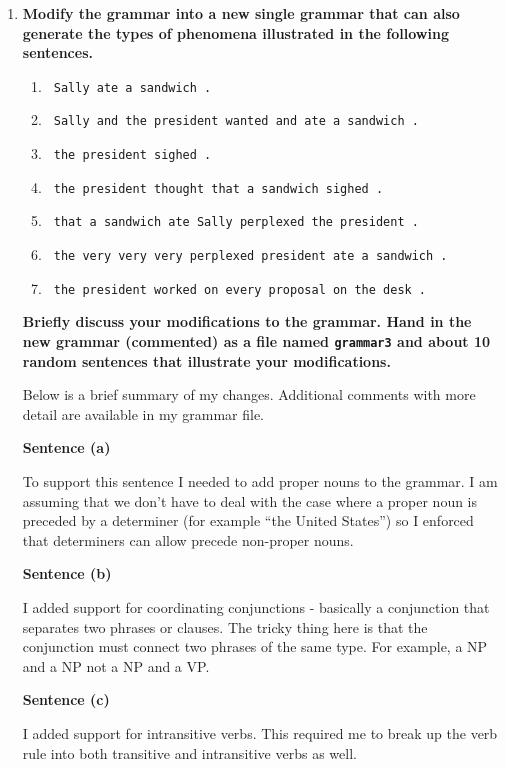 \documentclass[10pt]{article}
\begin{document}
\begin{enumerate}
\begin{enumerate}
{every perplexed sandwich kissed the president on a chief of staff with a president !

the fine chief of staff understood the president in the chief of staff .

}

\end{enumerate}
\item {\bf Modify the grammar into a new single grammar that can also generate the types of
  phenomena illustrated in the following sentences.}
\begin{enumerate}
\item \verb| Sally ate a sandwich .|
\item \verb| Sally and the president wanted and ate a sandwich .|
\item \verb| the president sighed .|
\item \verb| the president thought that a sandwich sighed .|
\item \verb| that a sandwich ate Sally perplexed the president .|
\item \verb| the very very very perplexed president ate a sandwich .|
\item \verb| the president worked on every proposal on the desk .|
\end{enumerate}

\noindent
{\bf Briefly discuss your modifications to the grammar. Hand
  in the new grammar (commented) as a file named \verb|grammar3| and about 10
  random sentences that illustrate your modifications.}

Below is a brief summary of my changes. Additional comments with more detail are available in my grammar file.

{\bf Sentence (a)}

To support this sentence I needed to add proper nouns to the grammar. I am assuming that we don't have to deal with the case where a proper noun is preceded by a determiner (for example ``the United States'') so I enforced that determiners can allow precede non-proper nouns.

{\bf Sentence (b)}

I added support for coordinating conjunctions - basically a conjunction that separates two phrases or clauses. The tricky thing here is that the conjunction must connect two phrases of the same type. For example, a NP and a NP not a NP and a VP. 

{\bf Sentence (c)}

I added support for intransitive verbs. This required me to break up the verb rule into both transitive and intransitive verbs as well.


\end{enumerate}
\end{document}
